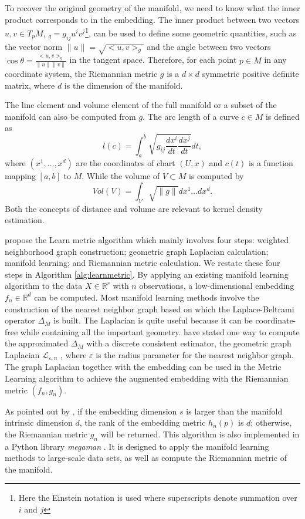 \documentclass[11pt,a4paper,]{article}
\begin{document}
To recover the original geometry of the manifold, we need to know what
the inner product corresponds to in the embedding. The inner product
between two vectors \(u,v \in T_pM\), \(<u,v>_g=g_{ij}u^iv^j\)\footnote{Here the Einstein notation is used where superscripts denote
  summation over \(i\) and \(j\)}, can be
used to define some geometric quantities, such as the vector norm
\(\|u\|=\sqrt{<u,v>_g}\) and the angle between two vectors
\(\cos{\theta}=\frac{<u,v>_g}{\|u\|\|v\|}\) in the tangent space.
Therefore, for each point \(p\in M\) in any coordinate system, the
Riemannian metric \(g\) is a \(d\times d\) symmetric positive definite
matrix, where \(d\) is the dimension of the manifold.

The line element and volume element of the full manifold or a subset of
the manifold can also be computed from \(g\). The arc length of a curve
\(c\in M\) is defined as \[
l(c)=\int_a^b \sqrt{g_{ij} \frac{dx^i}{dt} \frac{dx^j}{dt}} dt,
\] where \((x^1,\dots,x^d)\) are the coordinates of chart \((U,x)\) and
\(c(t)\) is a function mapping \([a,b]\) to \(M\). While the volume of
\(V\subset M\) is computed by \[
Vol(V)=\int_V \sqrt{\|g\|} dx^1\dots dx^d.
\] Both the concepts of distance and volume are relevant to kernel
density estimation.

\textcite{Perrault-Joncas2013-pq} propose the Learn metric algorithm which mainly
involves four steps: weighted neighborhood graph construction; geometric
graph Laplacian calculation; manifold learning; and Riemannian metric
calculation. We restate these four steps in Algorithm
\ref{alg:learnmetric}. By applying an existing manifold learning
algorithm to the data \(X\in \mathbb{R}^r\) with \(n\) observations, a
low-dimensional embedding \(f_n \in \mathbb{R}^d\) can be computed. Most
manifold learning methods involve the construction of the nearest
neighbor graph based on which the Laplace-Beltrami operator \(\Delta_M\)
is built. The Laplacian is quite useful because it can be
coordinate-free while containing all the important geometry.
\textcite{Perrault-Joncas2013-pq} have stated one way to compute the approximated
\(\Delta_M\) with a discrete consistent estimator, the geometric graph
Laplacian \(\mathcal{L}_{\varepsilon,n}\) \autocite{Zhou2011-za}, where
\(\varepsilon\) is the radius parameter for the nearest neighbor graph.
The graph Laplacian together with the embedding can be used in the
Metric Learning algorithm to achieve the augmented embedding with the
Riemannian metric \((f_n, g_n)\).

As pointed out by \textcite{Perrault-Joncas2013-pq}, if the embedding dimension
\(s\) is larger than the manifold intrinsic dimension \(d\), the rank of the
embedding metric \(h_n(p)\) is \(d\); otherwise, the Riemannian metric \(g_n\)
will be returned. This algorithm is also implemented in a Python library
\emph{megaman} \autocite{McQueen2016-xz}. It is designed to apply the manifold
learning methods to large-scale data sets, as well as compute the
Riemannian metric of the manifold.
\end{document}
